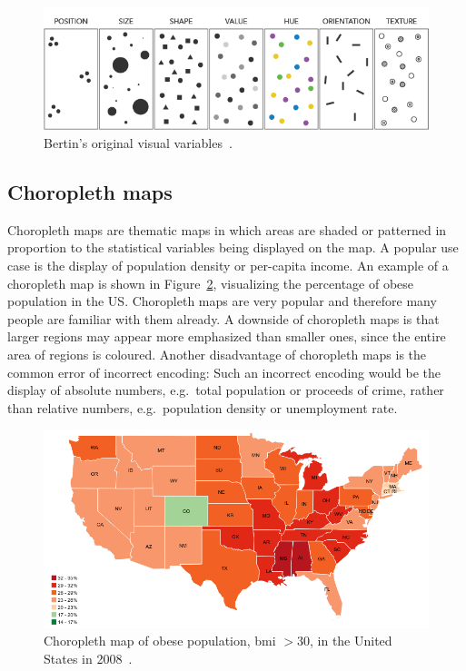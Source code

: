 \begin{figure}
  \centering
  \includegraphics[width=\textwidth]{figures/related-work/visual-variables}
  \caption{Bertin's original visual variables~\parencite{Foster2017}.}
  \label{fig:related-work:visual-variables}
\end{figure}

\subsection{Choropleth maps}
Choropleth maps are thematic maps in which areas are shaded or patterned in proportion to the statistical variables being displayed on the map.
A popular use case is the display of population density or per-capita income.
An example of a choropleth map is shown in Figure~\ref{fig:related-work:choropleth}, visualizing the percentage of obese population in the US\@.
Choropleth maps are very popular and therefore many people are familiar with them already.
A downside of choropleth maps is that larger regions may appear more emphasized than smaller ones, since the entire area of regions is coloured.
Another disadvantage of choropleth maps is the common error of incorrect encoding:
Such an incorrect encoding would be the display of absolute numbers, e.g.\ total population or proceeds of crime, rather than relative numbers, e.g.\ population density or unemployment rate.

\begin{figure}
  \includegraphics[width=\textwidth]{figures/related-work/choropleth}
  \caption{%
    Choropleth map of obese population, \gls{bmi} $ > 30 $, in the United States in 2008~\parencite{NCCDPHP2017}.
  }\label{fig:related-work:choropleth}
\end{figure}

